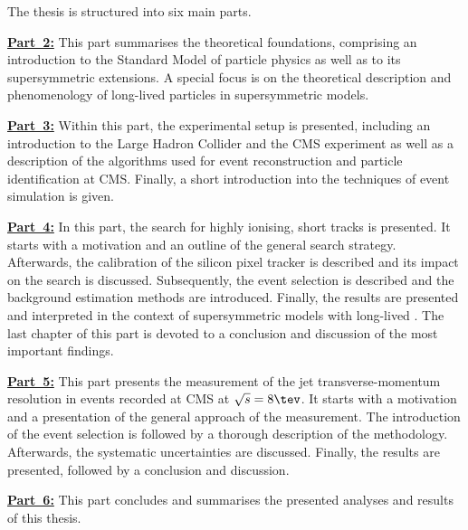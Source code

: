 \noindent The thesis is structured into six main parts.
\begin{description} 
\item \textbf{\hyperref[part:Theory]{Part~2:}} This part summarises the theoretical foundations, comprising an introduction to the Standard Model of particle physics as well as to its supersymmetric extensions. A special focus is on the theoretical description and phenomenology of long-lived particles in supersymmetric models. 
\item \textbf{\hyperref[part:Experiment]{Part~3:}} Within this part, the experimental setup is  presented, including an introduction to the Large Hadron Collider and the CMS experiment as well as a description of the algorithms used for event reconstruction and particle identification at CMS. Finally, a short introduction into the techniques of event simulation is given.
\item \textbf{\hyperref[part:analysis]{Part~4:}}  In this part, the search for highly ionising, short tracks is presented. It starts with a motivation and an outline of the general search strategy. Afterwards, the calibration of the silicon pixel tracker is described and its impact on the search is discussed. Subsequently, the event selection is described and the background estimation methods are introduced. Finally, the results are presented and interpreted in the context of supersymmetric models with long-lived \chipm. The last chapter of this part is devoted to a conclusion and discussion of the most important findings.
\item \textbf{\hyperref[part:resolution]{Part~5:}} This part presents the measurement of the jet transverse-momentum resolution in \GAMJET events recorded at CMS at $\sqrt{s}=8\tev$. It starts with a motivation and a presentation of the general approach of the measurement. The introduction of the event selection is followed by a thorough description of the methodology. Afterwards, the systematic uncertainties are discussed. Finally, the results are presented, followed by a conclusion and discussion.
\item \textbf{\hyperref[part:Summary]{Part~6:}} This part concludes and summarises the presented analyses and results of this thesis.
\end{description}

